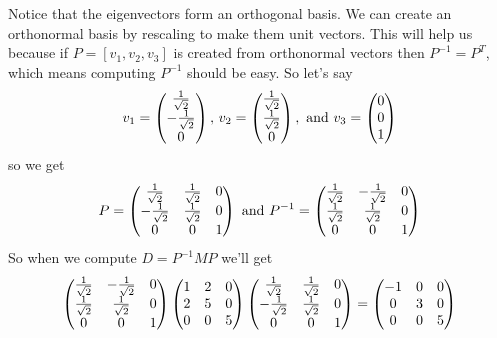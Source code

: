 {Notice that the eigenvectors form an orthogonal basis. We can create an orthonormal basis by rescaling to make them unit vectors. This will help us because if $P = [v_1,v_2,v_3]$ is created from orthonormal vectors then $P^{-1}=P^T$, which means computing $P^{-1}$ should be easy. So let's say 
\[
v_1 = \colvec{\frac{1}{\sqrt{2}}\\-\frac{1}{\sqrt{2}}\\\mc0}, \, v_2 = \colvec{\frac{1}{\sqrt{2}}\\\frac{1}{\sqrt{2}}\\\mc0}, \text{ and } v_3 = \colvec{0\\0\\1}
\]
so we get 
\[P=
\begin{pmatrix}
\frac{1}{\sqrt{2}} & \frac{1}{\sqrt{2}}& 0\\
-\frac{1}{\sqrt{2}} &\frac{1}{\sqrt{2}}& 0\\
\mc0&\mc0 & 1
\end{pmatrix} \text{ and }
P^{-1}=
 \begin{pmatrix}
\frac{1}{\sqrt{2}} & -\frac{1}{\sqrt{2}}& 0\\
\frac{1}{\sqrt{2}} &\frac{1}{\sqrt{2}}& 0\\
\mc0&\mc0 & 1
\end{pmatrix}
\]
So when we compute $D= P^{-1} M P$ we'll get 
\[
 \begin{pmatrix}
\frac{1}{\sqrt{2}} & -\frac{1}{\sqrt{2}}& 0\\
\frac{1}{\sqrt{2}} &\frac{1}{\sqrt{2}}& 0\\
\mc0&\mc0 & 1
\end{pmatrix}
\begin{pmatrix}
1 &2 & 0 \\
2 & 5 & 0 \\
0& 0 & 5  \\
\end{pmatrix}
\begin{pmatrix}
\frac{1}{\sqrt{2}} & \frac{1}{\sqrt{2}}& 0\\
-\frac{1}{\sqrt{2}} &\frac{1}{\sqrt{2}}& 0\\
\mc0&\mc0 & 1
\end{pmatrix}
= \begin{pmatrix}
-1 &0 & 0 \\
0 & 3 & 0 \\
0& 0 & 5  \\
\end{pmatrix}
\]
} %


